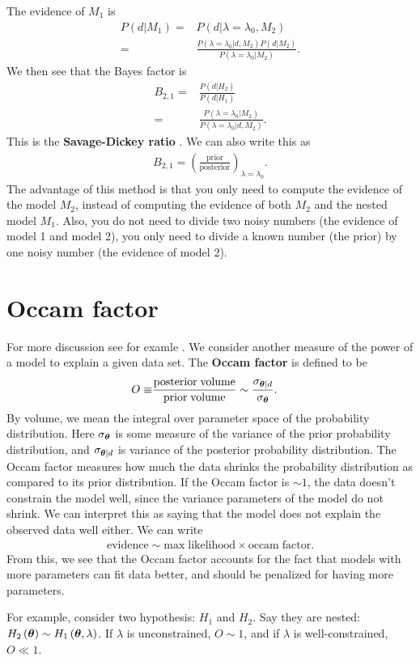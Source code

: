 The evidence of $M_1$ is
\begin{align}
    P\left(d|M_1\right)
    =&
    P\left(d|\lambda=\lambda_0,M_2\right)
    \nonumber\\
    =&
    \frac{
        P\left(\lambda=\lambda_0|d,M_2\right)P\left(d|M_2\right)
    }{
        P\left(\lambda=\lambda_0|M_2\right)
    } 
    .
\end{align}
We then see that the Bayes factor is
\begin{align}
    B_{2,1}
    =&
    \frac{P\left(d|H_2\right)}{P\left(d|H_1\right)}
    \nonumber\\
    =&
    \frac{
        P\left(\lambda=\lambda_0|M_2\right)
    }{
        P\left(\lambda=\lambda_0|d,M_2\right)
    }
    .
\end{align}
This is the \textbf{Savage-Dickey ratio} \cite{dickey-lientz-savage-dicke-ratio}.
We can also write this as
\begin{align}
    B_{2,1}
    =
    \left(\frac{\mathrm{prior}}{\mathrm{posterior}}\right)_{\lambda=\lambda_0}
    .
\end{align}
The advantage of this method is that you only need to compute the
evidence of the model $M_2$, instead of computing the evidence of both 
$M_2$ and the nested model $M_1$.
Also, you do not need to divide two noisy numbers (the evidence of
model 1 and model 2), you only need to divide a known number
(the prior) by one noisy number (the evidence of model 2).


\section{Occam factor}

For more discussion see for examle \cite{Mackay-information-theory-book}.
We consider another measure of the power of a model to explain a given data set.
The \textbf{Occam factor} is defined to be
\begin{align}
    O
    \equiv&
    \frac{\mathrm{posterior\; volume}}{\mathrm{prior\; volume}}
    \sim 
    \frac{\sigma_{{\bm \theta}|d}}{\sigma_{{\bm \theta}}}
    .
\end{align}
By volume, we mean the integral over parameter space of the
probability distribution.
Here $\sigma_{{\bm \theta}}$ is some measure of the variance of the
prior probability distribution, and $\sigma_{{\bm \theta}|d}$ is variance
of the posterior probability distribution.
The Occam factor measures how much the data shrinks the probability
distribution as compared to its prior distribution.
If the Occam factor is $\sim 1$, the data doesn't constrain
the model well, since the variance parameters of the model do not shrink.
We can interpret this as saying that the model does not explain the 
observed data well either.
We can write
\begin{align}
    \mathrm{evidence}
    \sim
    \mathrm{max\;likelihood}
    \times
    \mathrm{occam\; factor}
    .
\end{align}
From this, we see that 
the Occam factor accounts for the fact that models with more parameters
can fit data better, and should be penalized for having more parameters.

For example, consider two hypothesis: $H_1$ and $H_2$.
Say they are nested: $H_2\left({\bm \theta}\right) \sim H_1\left({\bm \theta},\lambda\right)$.
If $\lambda$ is unconstrained, $O\sim 1$, and if $\lambda$ is well-constrained,
$O\ll1$.

